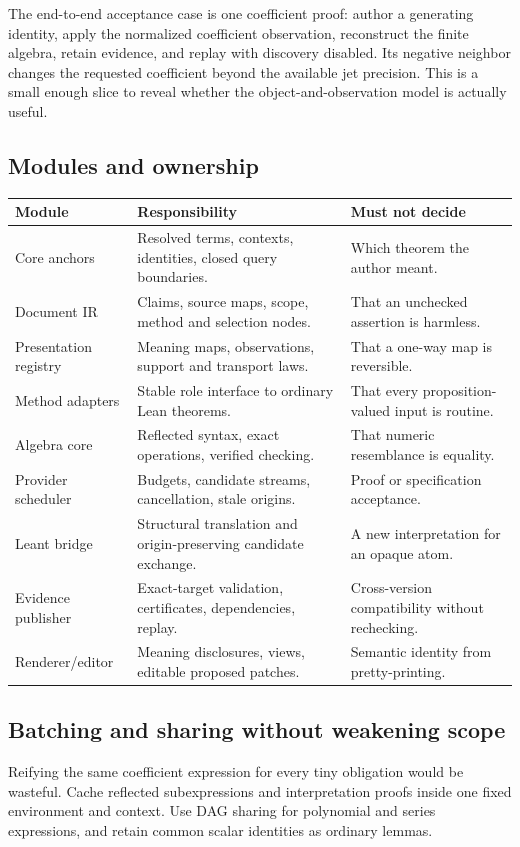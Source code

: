 \documentclass[11pt,a4paper]{article}
\theoremstyle{definition}
\begin{document}
The end-to-end acceptance case is one coefficient proof: author a generating
identity, apply the normalized coefficient observation, reconstruct the finite
algebra, retain evidence, and replay with discovery disabled. Its negative
neighbor changes the requested coefficient beyond the available jet precision.
This is a small enough slice to reveal whether the object-and-observation model
is actually useful.

\subsection{Modules and ownership}
\begin{longtable}{@{}P{.23\textwidth}P{.40\textwidth}P{.29\textwidth}@{}}
\toprule
Module & Responsibility & Must not decide\\
\midrule\endhead
Core anchors & Resolved terms, contexts, identities, closed query boundaries. & Which theorem the author meant.\\
Document IR & Claims, source maps, scope, method and selection nodes. & That an unchecked assertion is harmless.\\
Presentation registry & Meaning maps, observations, support and transport laws. & That a one-way map is reversible.\\
Method adapters & Stable role interface to ordinary Lean theorems. & That every proposition-valued input is routine.\\
Algebra core & Reflected syntax, exact operations, verified checking. & That numeric resemblance is equality.\\
Provider scheduler & Budgets, candidate streams, cancellation, stale origins. & Proof or specification acceptance.\\
Leant bridge & Structural translation and origin-preserving candidate exchange. & A new interpretation for an opaque atom.\\
Evidence publisher & Exact-target validation, certificates, dependencies, replay. & Cross-version compatibility without rechecking.\\
Renderer/editor & Meaning disclosures, views, editable proposed patches. & Semantic identity from pretty-printing.\\
\bottomrule
\end{longtable}

\subsection{Batching and sharing without weakening scope}
Reifying the same coefficient expression for every tiny obligation would be
wasteful. Cache reflected subexpressions and interpretation proofs inside one
fixed environment and context. Use DAG sharing for polynomial and series
expressions, and retain common scalar identities as ordinary lemmas.
\end{document}
